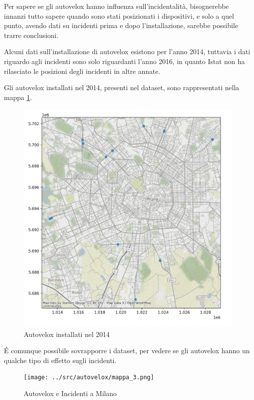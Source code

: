 \documentclass[a4paper]{report}
\begin{document}
Per sapere se gli autovelox hanno influenza sull'incidentalità, 
bisognerebbe innanzi tutto sapere quando sono stati posizionati i dispositivi, e solo a quel punto, 
avendo dati su incidenti prima e dopo l'installazione, sarebbe possibile trarre conclusioni.

Alcuni dati sull'installazione di autovelox esistono per l'anno 2014, tuttavia i dati 
riguardo agli incidenti sono solo riguardanti l'anno 2016, in quanto Istat non ha rilasciato 
le posizioni degli incidenti in altre annate.

Gli autovelox installati nel 2014, presenti nel dataset, 
sono rappresentati nella mappa \ref{fig:autovelox-2014}.
\begin{figure}
    \includegraphics[width=\linewidth]{../src/autovelox/autovelox_2014.png}
    \caption{Autovelox installati nel 2014}
    \label{fig:autovelox-2014}
\end{figure}

\'E comunque possibile sovrapporre i dataset, per vedere se gli autovelox hanno un qualche tipo di 
effetto sugli incidenti.

\begin{figure}
    \texttt{[image: ../src/autovelox/mappa\_3.png]}
    \caption{Autovelox e Incidenti a Milano}
    \label{fig:autovelox}
\end{figure}
\end{document}
